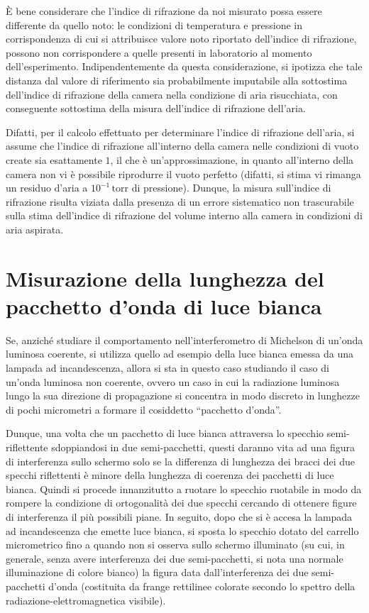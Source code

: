\documentclass[a4paper,12pt]{article}
\begin{document}
È bene considerare che l'indice di rifrazione da noi misurato possa essere differente da quello noto: le condizioni di temperatura e pressione in corrispondenza di cui si attribuisce valore noto riportato dell'indice di rifrazione, possono non corrispondere a quelle presenti in laboratorio al momento dell'esperimento.
Indipendentemente da questa considerazione, si ipotizza che tale distanza dal valore di riferimento sia probabilmente imputabile alla sottostima dell’indice di rifrazione della camera nella condizione di aria risucchiata, con conseguente sottostima della misura dell’indice di rifrazione dell’aria. 

Difatti, per il calcolo effettuato per determinare l’indice di rifrazione dell’aria, si assume che l’indice di rifrazione all’interno della camera nelle condizioni di vuoto create sia esattamente \( 1 \), il che è un’approssimazione, in quanto all’interno della camera non vi è possibile riprodurre il vuoto perfetto (difatti, si stima vi rimanga un residuo d’aria a \( 10^{-1} \, \text{torr} \) di pressione). Dunque, la misura sull’indice di rifrazione risulta viziata dalla presenza di un errore sistematico non trascurabile sulla stima dell’indice di rifrazione del volume interno alla camera in condizioni di aria aspirata.

\section{Misurazione della lunghezza del pacchetto d’onda di luce bianca}
Se, anziché studiare il comportamento nell’interferometro di Michelson di un’onda luminosa coerente, si utilizza quello ad esempio della luce bianca emessa da una lampada ad incandescenza, allora si sta in questo caso studiando il caso di un’onda luminosa non coerente, ovvero un caso in cui la radiazione luminosa lungo la sua direzione di propagazione si concentra in modo discreto in lunghezze di pochi micrometri a formare il cosiddetto “pacchetto d’onda”. 

Dunque, una volta che un pacchetto di luce bianca attraversa lo specchio semi-riflettente sdoppiandosi in due semi-pacchetti, questi daranno vita ad una figura di interferenza sullo schermo solo se la differenza di lunghezza dei bracci dei due specchi riflettenti è minore della lunghezza di coerenza dei pacchetti di luce bianca. 
Quindi si procede innanzitutto a ruotare lo specchio ruotabile in modo da rompere la condizione di ortogonalità dei due specchi cercando di ottenere figure di interferenza il più possibili piane. In seguito, dopo che si è accesa la lampada ad incandescenza che emette luce bianca, si sposta lo specchio dotato del carrello micrometrico fino a quando non si osserva sullo schermo illuminato (su cui, in generale, senza avere interferenza dei due semi-pacchetti, si nota una normale illuminazione di colore bianco) la figura data dall’interferenza dei due semi-pacchetti d’onda (costituita da frange rettilinee colorate secondo lo spettro della radiazione-elettromagnetica visibile). 
\end{document}

